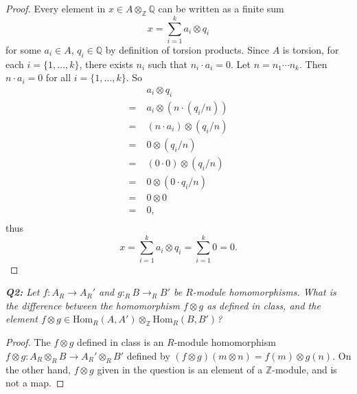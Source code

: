 \documentclass{article}
\begin{document}
\begin{enumerate}[label={(\alph*)}]
      \begin{proof}
        Every element in $x\in A\otimes_\mathbb{Z}\mathbb{Q}$ can be
        written as a finite sum
        \[x=\sum_{i=1}^k a_i\otimes q_i\]
        for some $a_i\in A$, $q_i\in \mathbb{Q}$ by definition of torsion
        products. Since $A$ is torsion, for each $i=\{1,\ldots,k\}$,
        there exists $n_i$ such that $n_i\cdot a_i=0$. Let $n=n_1\cdots
        n_k$. Then $n\cdot a_i=0$ for all $i=\{1,\ldots,k\}$. So
        \begin{align*}
          &\;a_i\otimes q_i\\
          =&\;a_i\otimes(n\cdot(q_i/n))\\
          =&\;(n\cdot a_i)\otimes(q_i/n)\\
          =&\;0\otimes(q_i/n)\\
          =&\;(0\cdot0)\otimes(q_i/n)\\
          =&\;0\otimes(0\cdot q_i/n)\\
          =&\;0\otimes0\\
          =&\;0,\\
        \end{align*}
        thus
        \[x=\sum_{i=1}^k a_i\otimes q_i =\sum_{i=1}^k 0=0.\]
      \end{proof}
  \end{enumerate}

\it \textbf{Q2:} Let $f:A_R\rightarrow A_R'$ and $g:_RB\rightarrow_RB'$ be
  $R$-module homomorphisms. What is the difference between the homomorphism
  $f\otimes g$ as defined in class, and the element $f\otimes
  g\in\text{Hom}_R(A,A') \otimes_\mathbb{Z}\text{Hom}_R(B,B')$?

  \begin{proof}
    The $f\otimes g$ defined in class is an $R$-module homomorphism
    $f\otimes g:A_R\otimes_RB\rightarrow A_R'\otimes_RB'$ defined by
    $(f\otimes g)(m\otimes n)=f(m)\otimes g(n)$. On the other hand,
    $f\otimes g$ given in the question is an element of a
    $\mathbb{Z}$-module, and is not a map.
  \end{proof}
\end{document}
